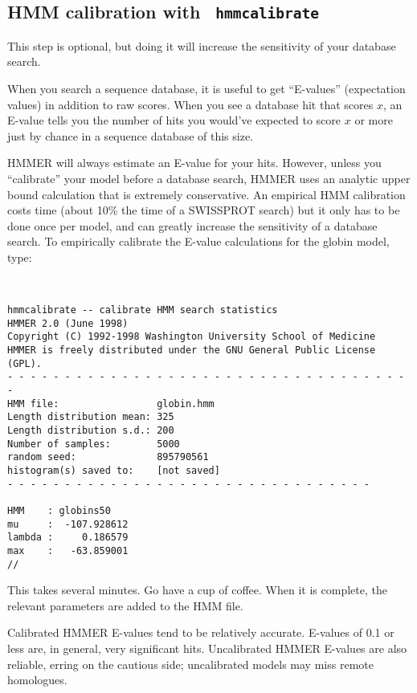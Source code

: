 \documentclass[11pt]{report}
\newcommand{\prog}[1]{\texttt{#1}}
\newcommand{\user}[1]{\noindent{\small\bfseries\texttt{$>$ #1}}\\}
\begin{document}
\subsection{HMM calibration with \prog{ hmmcalibrate}}

This step is optional, but doing it will increase the sensitivity of
your database search.

When you search a sequence database, it is useful to get ``E-values''
(expectation values) in addition to raw scores. When you see a
database hit that scores $x$, an E-value tells you the number of hits
you would've expected to score $x$ or more just by chance in a
sequence database of this size. 

HMMER will always estimate an E-value for your hits. However, unless
you ``calibrate'' your model before a database search, HMMER uses an
analytic upper bound calculation that is extremely conservative.  An
empirical HMM calibration costs time (about 10\% the time of a
SWISSPROT search) but it only has to be done once per model, and can
greatly increase the sensitivity of a database search. To empirically
calibrate the E-value calculations for the globin model, type:

\vspace{1.5em}
\user{hmmcalibrate globin.hmm}
\vspace{-1.5em}
{\small\begin{verbatim}
hmmcalibrate -- calibrate HMM search statistics
HMMER 2.0 (June 1998)
Copyright (C) 1992-1998 Washington University School of Medicine
HMMER is freely distributed under the GNU General Public License (GPL).
- - - - - - - - - - - - - - - - - - - - - - - - - - - - - - - - - - - -
HMM file:                 globin.hmm
Length distribution mean: 325
Length distribution s.d.: 200
Number of samples:        5000
random seed:              895790561
histogram(s) saved to:    [not saved]
- - - - - - - - - - - - - - - - - - - - - - - - - - - - - - - -

HMM    : globins50
mu     :  -107.928612
lambda :     0.186579
max    :   -63.859001
//
\end{verbatim}}

This takes several minutes. Go have a cup of coffee. When it is
complete, the relevant parameters are added to the HMM file.

Calibrated HMMER E-values tend to be relatively accurate. E-values of
0.1 or less are, in general, very significant hits. Uncalibrated HMMER
E-values are also reliable, erring on the cautious side; uncalibrated
models may miss remote homologues.
\end{document}
